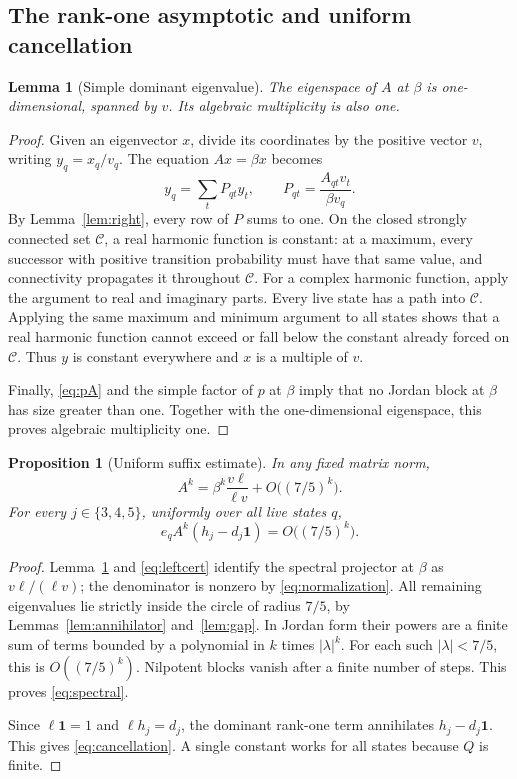 \documentclass[11pt,a4paper]{article}
\newtheorem{lemma}[theorem]{Lemma}
\newtheorem{proposition}[theorem]{Proposition}
\theoremstyle{definition}
\theoremstyle{remark}
\newcommand{\one}{\mathbf 1}
\newcommand{\cc}{\mathcal C}
\begin{document}
\subsection{The rank-one asymptotic and uniform cancellation}
\begin{lemma}[Simple dominant eigenvalue]\label{lem:simple}
The eigenspace of $A$ at $\beta$ is one-dimensional, spanned by $v$.
Its algebraic multiplicity is also one.
\end{lemma}
\begin{proof}
Given an eigenvector $x$, divide its coordinates by the positive vector
$v$, writing $y_q=x_q/v_q$. The equation $Ax=\beta x$ becomes
\[
 y_q=\sum_t P_{qt}y_t,
 \qquad
 P_{qt}=\frac{A_{qt}v_t}{\beta v_q}.
\]
By Lemma~\ref{lem:right}, every row of $P$ sums to one. On the closed
strongly connected set $\cc$, a real harmonic function is constant: at a
maximum, every successor with positive transition probability must have
that same value, and connectivity propagates it throughout $\cc$.
For a complex harmonic function, apply the argument to real and imaginary
parts. Every live state has a path into $\cc$. Applying the same maximum
and minimum argument to all states shows that a real harmonic function
cannot exceed or fall below the constant already forced on $\cc$.
Thus $y$ is constant everywhere and $x$ is a multiple of $v$.

Finally, \eqref{eq:pA} and the simple factor of $p$ at $\beta$ imply that
no Jordan block at $\beta$ has size greater than one. Together with the
one-dimensional eigenspace, this proves algebraic multiplicity one.
\end{proof}

\begin{proposition}[Uniform suffix estimate]\label{prop:spectral}
In any fixed matrix norm,
\begin{equation}\label{eq:spectral}
 A^k=\beta^k\frac{v\ell}{\ell v}
      +O\bigl((7/5)^k\bigr).
\end{equation}
For every $j\in\{3,4,5\}$, uniformly over all live states $q$,
\begin{equation}\label{eq:cancellation}
 e_qA^k(h_j-d_j\one)=O\bigl((7/5)^k\bigr).
\end{equation}
\end{proposition}
\begin{proof}
Lemma~\ref{lem:simple} and \eqref{eq:leftcert} identify the spectral
projector at $\beta$ as $v\ell/(\ell v)$; the denominator is nonzero by
\eqref{eq:normalization}. All remaining eigenvalues lie strictly inside
the circle of radius $7/5$, by Lemmas~\ref{lem:annihilator}
and~\ref{lem:gap}. In Jordan form their powers are a finite sum of terms
bounded by a polynomial in $k$ times $|\lambda|^k$. For each such
$|\lambda|<7/5$, this is $O((7/5)^k)$. Nilpotent blocks vanish after a
finite number of steps. This proves \eqref{eq:spectral}.

Since $\ell\one=1$ and $\ell h_j=d_j$, the dominant rank-one term
annihilates $h_j-d_j\one$. This gives \eqref{eq:cancellation}. A single
constant works for all states because $Q$ is finite.
\end{proof}
\end{document}
